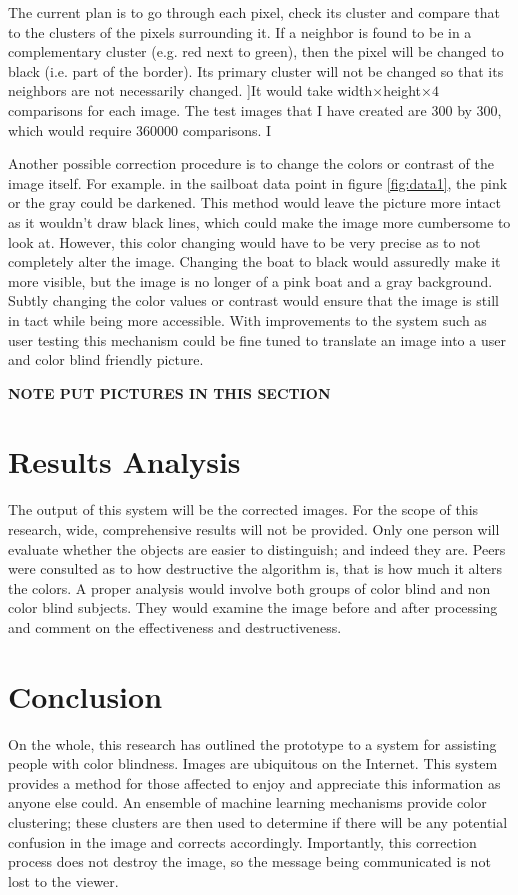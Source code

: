 \documentclass[12pt]{article}
\begin{document}
The current plan is to go through each pixel, check its cluster and compare that to the clusters of the pixels surrounding it. If a neighbor is found to be in a complementary cluster (e.g. red next to green), then the pixel will be changed to black (i.e. part of the border). Its primary cluster will not be changed so that its neighbors are not necessarily changed. ]It would take width$\times$height$\times 4$ comparisons for each image. The test images that I have created are 300 by 300, which would require 360000 comparisons. I

Another possible correction procedure is to change the colors or contrast of the image itself. For example. in the sailboat data point in figure \ref{fig:data1}, the pink or the gray could be darkened. This method would leave the picture more intact as it wouldn't draw black lines, which could make the image more cumbersome to look at. However, this color changing would have to be very precise as to not completely alter the image. Changing the boat to black would assuredly make it more visible, but the image is no longer of a pink boat and a gray background. Subtly changing the color values or contrast would ensure that the image is still in tact while being more accessible. With improvements to the system such as user testing this mechanism could be fine tuned to translate an image into a user and color blind friendly picture.



 \textbf{NOTE PUT PICTURES IN THIS SECTION}

\section{Results Analysis}


The output of this system will be the corrected images. For the scope of this research, wide, comprehensive results will not be provided. Only one person will evaluate whether the objects are easier to distinguish; and indeed they are. Peers were consulted  as to how destructive the algorithm is, that is how much it alters the colors. A proper analysis would involve both groups of color blind and non color blind subjects. They would examine the image before and after processing and comment on the effectiveness and destructiveness. 

\section{Conclusion}
On the whole, this research has outlined the prototype to a system for assisting people with color blindness. Images are ubiquitous on the Internet. This system provides a method for those affected to enjoy and appreciate this information as anyone else could. An ensemble of machine learning mechanisms provide color clustering; these clusters are then used to determine if there will be any potential confusion in the image and corrects accordingly. Importantly, this correction process does not destroy the image, so the message being communicated is not lost to the viewer.
\end{document}
